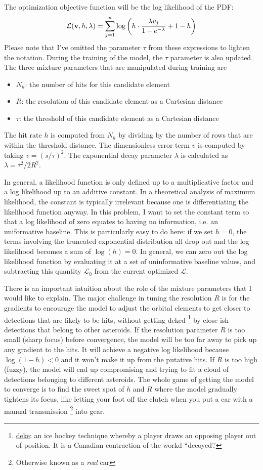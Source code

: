 The optimization objective function will be the log likelihood of the PDF:
$$ \mathcal{L}(\mathbf{v}, h, \lambda) = \sum_{j=1}^{n} \log \left( h \cdot \frac{\lambda v_j}{1 - e^{-\lambda}} + 1 - h \right)$$
Please note that I've omitted the parameter $\tau$ from these expressions to lighten the notation.
During the training of the model, the $\tau$ parameter is also updated.
The three mixture parameters that are manipulated during training are 
\begin{itemize}
\item $N_h$: the number of hits for this candidate element
\item $R$: the resolution of this candidate element as a Cartesian distance
\item $\tau$: the threshold of this candidate element as a Cartesian distance
\end{itemize}
The hit rate $h$ is computed from $N_h$ by dividing by the number of rows that are within the threshold distance.
The dimensionless error term $v$ is computed by taking $v = (s/\tau)^2$.
The exponential decay parameter $\lambda$ is calculated as $\lambda = \tau^2 / 2R^2$.

In general, a likelihood function is only defined up to a multiplicative factor and a log likelihood up to an additive constant.
In a theoretical analysis of maximum likelihood, the constant is typically irrelevant because one is differentiating the likelihood function anyway.
In this problem, I want to set the constant term so that a log likelihood of zero equates to having no information,
i.e. an uniformative baseline.
This is particularly easy to do here: if we set $h=0$, the terms involving the truncated exponential distribution all drop out 
and the log likelihood becomes a sum of $\log(h) = 0$.
In general, we can zero out the log likelihood function by evaluating it at a set of uninformative baseline values, 
and subtracting this quantity $\mathcal{L}_0$ from the current optimized $\mathcal{L}$.

There is an important intuition about the role of the mixture parameters that I would like to explain.
The major challenge in tuning the resolution $R$ is for the gradients to encourage the model to adjust the orbital elements
to get closer to detections that are likely to be hits, without getting deked 
\footnote{\href{https://en.wikipedia.org/wiki/Deke_(ice_hockey)}{deke}: an ice hockey technique whereby a player draws an opposing player out of position.
It is a Canadian contraction of the workd ``decoyed'.'}
by close-ish detections that belong to other asteroids.
If the resolution parameter $R$ is too small (sharp focus) before convergence, the model will be too far away to pick up any gradient to the hits.
It will achieve a negative log likelihood because $\log(1-h) < 0$ and it won't make it up from the putative hits.
If $R$ is too high (fuzzy), the model will end up compromising and trying to fit a cloud of detections belonging to different asteroids.
The whole game of getting the model to converge is to find the sweet spot of $h$ and $R$ where the model gradually tightens its focus,
like letting your foot off the clutch when you put a car with a manual transmission \footnote{Otherwise known as a \textit{real} car} into gear. 

